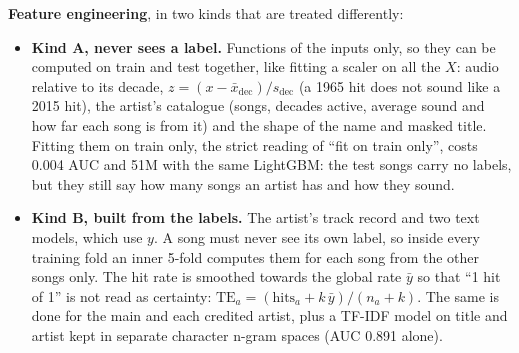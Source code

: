 \documentclass[10pt,a4paper,twocolumn]{extarticle}
\begin{document}
\textbf{Feature engineering}, in two kinds that are treated differently:
\begin{itemize}
  \item \textbf{Kind A, never sees a label.} Functions of the inputs only, so they can be
  computed on train and test together, like fitting a scaler on all the $X$: audio
  relative to its decade, $z=(x-\bar x_{\text{dec}})/s_{\text{dec}}$ (a 1965 hit does
  not sound like a 2015 hit), the artist's catalogue (songs, decades active, average
  sound and how far each song is from it) and the shape of the name and masked title. Fitting them on train only, the strict reading of
  ``fit on train only'', costs 0.004 AUC and 51M with the same LightGBM: the test songs carry no
  labels, but they still say how many songs an artist has and how they sound.
  \item \textbf{Kind B, built from the labels.} The artist's track record and two text
  models, which use $y$. A song must never see its own label, so inside every training
  fold an inner 5-fold computes them for each song from the other songs only. The hit
  rate is smoothed towards the global rate $\bar y$ so that ``1 hit of 1'' is not read
  as certainty: $\text{TE}_a=(\text{hits}_a+k\,\bar y)/(n_a+k)$. The same is done for the
  main and each credited artist, plus a TF-IDF model on title and artist kept in separate
  character n-gram spaces (AUC 0.891 alone).
\end{itemize}
\end{document}
